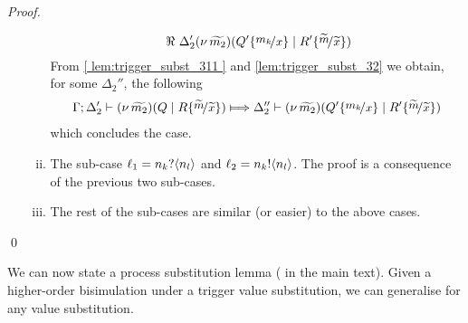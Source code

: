 \begin{proof}
\begin{enumerate}
\begin{enumerate}[i.]
\[%
								{\ \Re\ }
								{\Delta_2'}{}{  \newsp{\widetilde{m_2}}{Q' \subst{m_k}{x} \Par R' \subst{\widetilde{m}}{\widetilde{x}} } }
							\]
							From \eqref{ lem:trigger_subst_311 } and \eqref{lem:trigger_subst_32} we obtain, for some $\Delta_2''$, the following
							\begin{eqnarray*}
								\horel{\Gamma}{\Delta_2'}{ \newsp{\widetilde{m_2}}{Q \Par R \subst{\widetilde{m}}{\widetilde{x}} }}
								{ \Hby{  } }
								{\Delta_2''}{  \newsp{\widetilde{m_2}}{Q' \subst{m_k}{x} \Par R' \subst{\widetilde{m}}{\widetilde{x}} }   }
							\end{eqnarray*}
							which concludes the case.

					\item	The sub-case
							$\ell_1 = n_k ? \langle n_l \rangle$ and $\ell_2 = n_k ! \langle n_l \rangle$.
							The proof is a consequence of the previous two sub-cases.	




					\item	The rest of the sub-cases are similar (or easier) to the above cases.

%					
				\end{enumerate}
	\end{enumerate}
	\qed
\end{proof}




We can now state a process substitution lemma
( in the main text).
Given a higher-order bisimulation under a trigger value
substitution, we can generalise for any value substitution.



